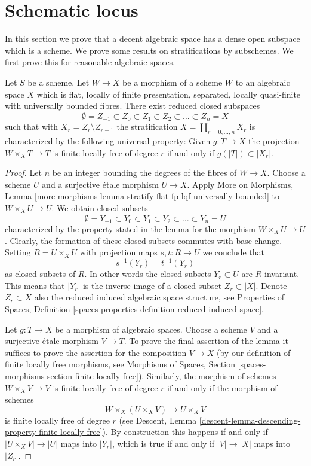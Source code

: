 \section{Schematic locus}
\label{section-schematic}

\noindent
In this section we prove that a decent algebraic space has a dense open
subspace which is a scheme. We prove some results on stratifications by
subschemes. We first prove this for reasonable algebraic spaces.

\begin{lemma}
\label{lemma-quasi-compact-reasonable-stratification}
Let $S$ be a scheme. Let $W \to X$ be a morphism of a scheme $W$
to an algebraic space $X$ which is flat, locally of finite presentation,
separated, locally quasi-finite with universally bounded fibres. There exist
reduced closed subspaces
$$
\emptyset = Z_{-1} \subset Z_0 \subset Z_1 \subset Z_2 \subset
\ldots \subset Z_n = X
$$
such that with $X_r = Z_r \setminus Z_{r - 1}$ the stratification
$X = \coprod_{r = 0, \ldots, n} X_r$ is characterized by the following
universal property: Given $g : T \to X$ the projection
$W \times_X T \to T$ is finite locally free of degree $r$ if and only if
$g(|T|) \subset |X_r|$.
\end{lemma}

\begin{proof}
Let $n$ be an integer bounding the degrees of the fibres of $W \to X$.
Choose a scheme $U$ and a surjective \'etale morphism $U \to X$.
Apply More on Morphisms, Lemma
\ref{more-morphisms-lemma-stratify-flat-fp-lqf-universally-bounded}
to $W \times_X U \to U$. We obtain closed subsets
$$
\emptyset = Y_{-1} \subset Y_0 \subset Y_1 \subset Y_2 \subset
\ldots \subset Y_n = U
$$
characterized by the property stated in the lemma for the morphism
$W \times_X U \to U$. Clearly, the formation of these closed subsets commutes
with base change. Setting $R = U \times_X U$ with projection maps
$s, t : R \to U$ we conclude that
$$
s^{-1}(Y_r) = t^{-1}(Y_r)
$$
as closed subsets of $R$. In other words the closed subsets $Y_r \subset U$
are $R$-invariant. This means that $|Y_r|$ is the inverse image of a closed
subset $Z_r \subset |X|$. Denote $Z_r \subset X$ also the reduced induced
algebraic space structure, see
Properties of Spaces, Definition
\ref{spaces-properties-definition-reduced-induced-space}.

\medskip\noindent
Let $g : T \to X$ be a morphism of algebraic spaces. Choose a scheme $V$
and a surjective \'etale morphism $V \to T$. To prove the final
assertion of the lemma it suffices to prove the assertion for the composition
$V \to X$ (by our definition of finite locally free morphisms, see
Morphisms of Spaces, Section
\ref{spaces-morphisms-section-finite-locally-free}).
Similarly, the morphism of schemes $W \times_X V \to V$ is finite
locally free of degree $r$ if and only if the morphism of schemes
$$
W \times_X (U \times_X V)
\longrightarrow
U \times_X V
$$
is finite locally free of degree $r$ (see
Descent, Lemma \ref{descent-lemma-descending-property-finite-locally-free}).
By construction this happens if and only if $|U \times_X V| \to |U|$
maps into $|Y_r|$, which is true if and only if $|V| \to |X|$ maps
into $|Z_r|$.
\end{proof}

